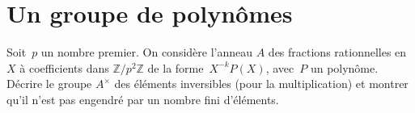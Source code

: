 
\section{Un groupe de polynômes}

Soit~$p$ un nombre premier.
On considère l'anneau  $A$ des fractions rationnelles en $X$ à coefficients dans $\mathbb{Z}/p^2 \mathbb{Z}$ de la forme~$X^{-k} P(X)$, avec~$P$ un polynôme.
Décrire le groupe $A^\times$ des éléments inversibles (pour la multiplication) et montrer qu'il n'est pas engendré par un nombre fini d'éléments.


